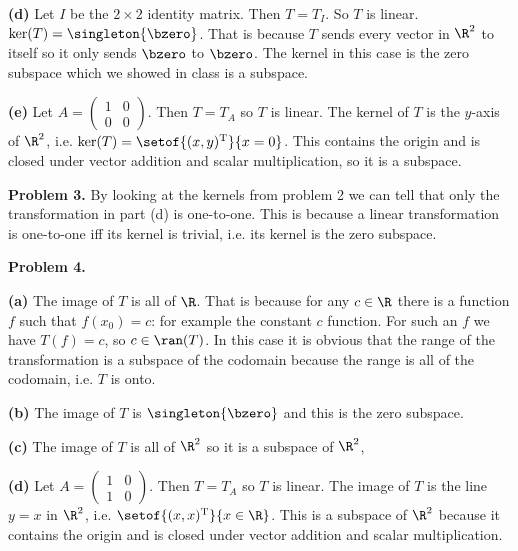 \documentclass[oneside,12pt]{amsart}
\begin{document}
\bigskip

\textbf{(d)} Let $I$ be the $2\times 2$ identity matrix. Then $T=T_I$. So $T$
is linear. $\ker(T) = \singleton{\bzero}$. That is because $T$ sends every vector in
$\R^2$ to itself so it only sends $\bzero$ to $\bzero$. The kernel in this
case is the zero subspace which we showed in class is a subspace.

\bigskip

\textbf{(e)} Let $A=
\begin{pmatrix}
1 & 0 \\
0 & 0
\end{pmatrix}
$.
Then $T=T_A$ so $T$ is linear. The kernel of $T$ is the $y$-axis of $\R^2$, i.e.
$\ker(T) = \setof{(x,y)^{\text{T}}}{x=0}$. This contains the origin and
is closed under vector addition and scalar multiplication, so it is a subspace.

\bigskip

\textbf{Problem 3.} By looking at the kernels from problem 2 we can tell
that only the transformation in part (d) is one-to-one. This is because
a linear transformation is one-to-one iff its kernel is trivial, i.e.
its kernel is the zero subspace.

\bigskip

\textbf{Problem 4.}

\textbf{(a)} The image of $T$ is all of $\R$. That is because for any $c\in\R$
there is a function $f$ such that $f(x_0) = c$: for example the constant
$c$ function. For such an $f$ we have $T(f) = c$, so $c\in\ran(T)$.
In this case it is obvious that the range of the transformation
is a subspace of the codomain because the range is all of the codomain, i.e.
$T$ is onto.

\bigskip

\textbf{(b)} The image of $T$ is $\singleton{\bzero}$ and this is the zero
subspace.

\bigskip

\textbf{(c)} The image of $T$ is all of $\R^2$ so it is a subspace of $\R^2$,

\bigskip

\textbf{(d)} Let $A=
\begin{pmatrix}
1 & 0 \\
1 & 0
\end{pmatrix}
$.
Then $T=T_A$ so $T$ is linear.
The image of $T$ is the line $y=x$ in $\R^2$, i.e.
$\setof{(x,x)^{\text{T}}}{x\in\R}$. This is a subspace of $\R^2$ because
it contains the origin and is closed under vector addition and scalar
multiplication.
\end{document}
